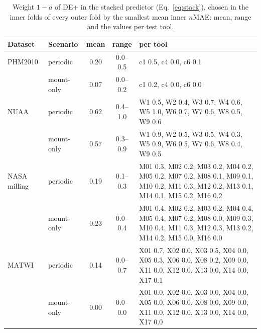 \begin{table}[!htbp]
\centering
\caption{Weight $1-a$ of DE+ in the stacked predictor (Eq.~\eqref{eq:stack}), chosen in the inner folds of every outer fold by the smallest mean inner $n$MAE: mean, range and the values per test tool.}
\label{tab:Sstack}
\footnotesize\setlength{\tabcolsep}{4pt}
\begin{tabular}{llccp{7.2cm}}
\toprule
Dataset & Scenario & mean & range & per tool\\
\midrule
PHM2010 & periodic & 0.20 & 0.0--0.5 & c1 0.5, c4 0.0, c6 0.1\\
 & mount-only & 0.07 & 0.0--0.2 & c1 0.2, c4 0.0, c6 0.0\\
NUAA & periodic & 0.62 & 0.4--1.0 & W1 0.5, W2 0.4, W3 0.7, W4 0.6, W5 1.0, W6 0.7, W7 0.6, W8 0.5, W9 0.6\\
 & mount-only & 0.57 & 0.3--0.9 & W1 0.9, W2 0.5, W3 0.5, W4 0.3, W5 0.9, W6 0.5, W7 0.6, W8 0.4, W9 0.5\\
NASA milling & periodic & 0.19 & 0.1--0.3 & M01 0.3, M02 0.2, M03 0.2, M04 0.2, M05 0.2, M07 0.2, M08 0.1, M09 0.1, M10 0.2, M11 0.3, M12 0.2, M13 0.1, M14 0.1, M15 0.2, M16 0.2\\
 & mount-only & 0.23 & 0.0--0.4 & M01 0.4, M02 0.2, M03 0.2, M04 0.4, M05 0.4, M07 0.2, M08 0.0, M09 0.3, M10 0.4, M11 0.3, M12 0.3, M13 0.2, M14 0.2, M15 0.0, M16 0.0\\
MATWI & periodic & 0.14 & 0.0--0.7 & X01 0.7, X02 0.0, X03 0.5, X04 0.0, X05 0.3, X06 0.0, X08 0.2, X09 0.0, X11 0.0, X12 0.0, X13 0.0, X14 0.0, X17 0.1\\
 & mount-only & 0.00 & 0.0--0.0 & X01 0.0, X02 0.0, X03 0.0, X04 0.0, X05 0.0, X06 0.0, X08 0.0, X09 0.0, X11 0.0, X12 0.0, X13 0.0, X14 0.0, X17 0.0\\
\bottomrule
\end{tabular}
\end{table}
